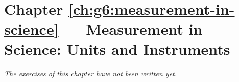 \section*{Chapter \ref{ch:g6:measurement-in-science} --- Measurement in Science: Units and Instruments}


\emph{The exercises of this chapter have not been written yet.}
